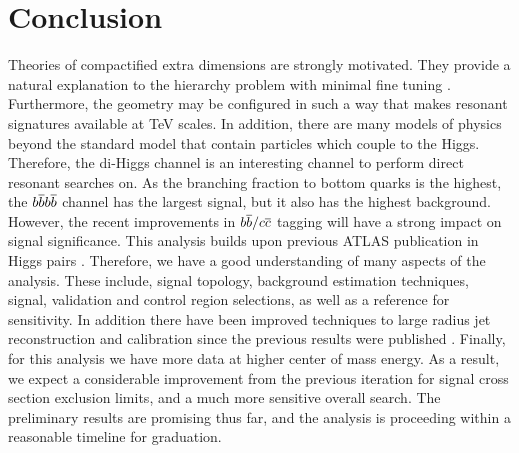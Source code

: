 \documentclass[12pt]{article}
\begin{document}
\section{Conclusion}
Theories of compactified extra dimensions are strongly motivated. They provide a
natural explanation to the hierarchy problem with minimal fine tuning
\cite{RandallSundrumOriginal, bsm}. Furthermore, the geometry may be configured
in such a way that makes resonant signatures available at TeV scales. In
addition, there are many models of physics beyond the standard model that
contain particles which couple to the Higgs. Therefore, the di-Higgs channel is
an interesting channel to perform direct resonant searches on. As the branching
fraction to bottom quarks is the highest, the $b\overline{b}b\overline{b}$ channel has the largest
signal, but it also has the highest background. However, the recent improvements
in $b\overline{b}/c\overline{c}$ tagging will have a strong impact on signal significance.
This analysis builds upon previous ATLAS publication in Higgs pairs
\cite{atlas_resonant_2022, atlas_hhbbbb_vbf}. Therefore, we have a good
understanding of many aspects of the analysis. These include, signal topology,
background estimation techniques, signal, validation and control region
selections, as well as a reference for sensitivity. In addition there have been
improved techniques to large radius jet reconstruction and calibration since the
previous results were published \cite{large_r_jet}. Finally, for this analysis
we have more data at higher center of mass energy. As a result, we expect a
considerable improvement from the previous iteration for signal cross section
exclusion limits, and a much more sensitive overall search. The preliminary
results are promising thus far, and the analysis is proceeding within a
reasonable timeline for graduation.
\end{document}
